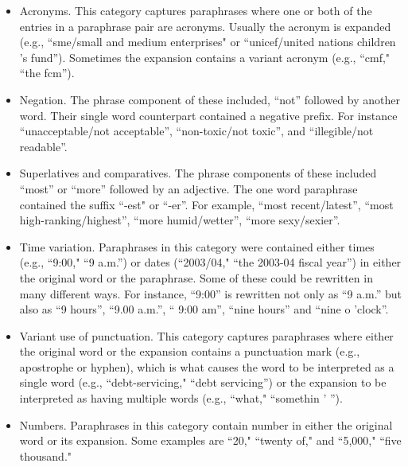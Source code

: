 \documentclass[11pt]{article}
\begin{document}
\begin{itemize}

\item Acronyms. This category captures paraphrases where one or both of the entries in a paraphrase pair are acronyms. Usually the acronym is expanded (e.g., ``sme/small and medium enterprises" or ``unicef/united nations children 's fund'').  Sometimes the expansion contains a variant acronym (e.g., ``cmf," ``the fcm'').

\item Negation.  The phrase component of these included, ``not'' followed by another word.  Their single word counterpart contained a negative prefix.   For instance ``unacceptable/not acceptable'', ``non-toxic/not toxic'', and ``illegible/not readable''.

\item Superlatives and comparatives. The phrase components of these included ``most'' or ``more'' followed by an adjective.  The one word paraphrase contained the suffix ``-est" or ``-er''.  For example, ``most recent/latest'', ``most high-ranking/highest'', ``more humid/wetter'', ``more sexy/sexier''.
%
%



\item Time variation. Paraphrases in this category were contained either times (e.g., ``9:00," ``9 a.m.'') or dates (``2003/04," ``the 2003-04 fiscal year'') in either the original word or the paraphrase.  Some of these could be rewritten in many different ways.  For instance, ``9:00'' is rewritten not only as ``9 a.m.'' but also as ``9 hours'', ``9.00 a.m.'', `` 9:00 am'', ``nine hours'' and ``nine o 'clock''.

\item  Variant use of punctuation. This category captures paraphrases where either the original word or the expansion contains a punctuation mark (e.g., apostrophe or hyphen), which is what causes the word to be interpreted as a single word (e.g., ``debt-servicing," ``debt servicing'') or the expansion to be interpreted as having multiple words (e.g., ``what," ``somethin ' '').

\item Numbers. Paraphrases in this category contain number in either the original word or its expansion. Some examples are ``20," ``twenty of," and ``5,000," ``five thousand."

\end{itemize}
\end{document}
